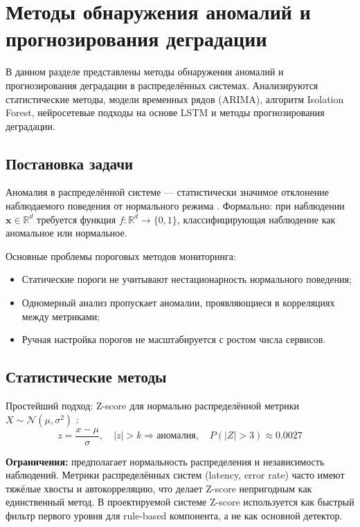 \chapter{Методы обнаружения аномалий и прогнозирования деградации}\label{ch:anomaly}

В данном разделе представлены методы обнаружения аномалий и прогнозирования деградации в распределённых системах. Анализируются статистические методы, модели временных рядов (ARIMA), алгоритм Isolation Forest, нейросетевые подходы на основе LSTM и методы прогнозирования деградации.

\section{Постановка задачи}

Аномалия в распределённой системе --- статистически значимое отклонение наблюдаемого поведения от нормального режима \cite{anomaly_detection_survey,russian_anomaly_detection}. Формально: при наблюдении $\mathbf{x} \in \mathbb{R}^d$ требуется функция $f: \mathbb{R}^d \to \{0, 1\}$, классифицирующая наблюдение как аномальное или нормальное.

Основные проблемы пороговых методов мониторинга:
\begin{itemize}
    \item Статические пороги не учитывают нестационарность нормального поведения;
    \item Одномерный анализ пропускает аномалии, проявляющиеся в корреляциях между метриками;
    \item Ручная настройка порогов не масштабируется с ростом числа сервисов.
\end{itemize}


\section{Статистические методы}

Простейший подход: Z-score для нормально распределённой метрики $X \sim \mathcal{N}(\mu, \sigma^2)$ \cite{hastie_elements,murphy_machine_learning}:
\begin{equation}
z = \frac{x - \mu}{\sigma}, \quad |z| > k \Rightarrow \text{аномалия}, \quad P(|Z| > 3) \approx 0.0027
\label{eq:z_score}
\end{equation}

\textbf{Ограничения:} предполагает нормальность распределения и независимость наблюдений. Метрики распределённых систем (latency, error rate) часто имеют тяжёлые хвосты и автокорреляцию, что делает Z-score непригодным как единственный метод. В проектируемой системе Z-score используется как быстрый фильтр первого уровня для rule-based компонента, а не как основной детектор.

